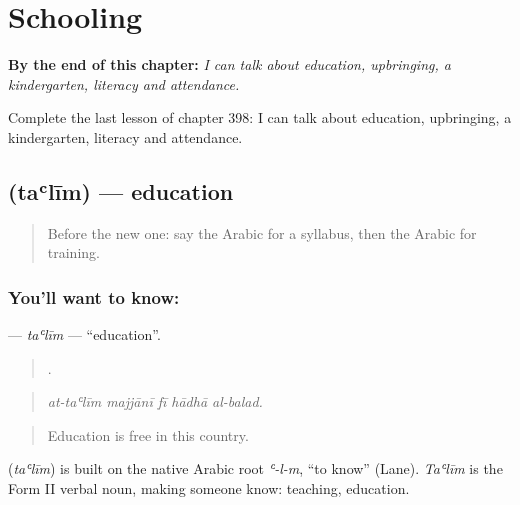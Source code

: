 
\chapter{Schooling}
\label{ch:ar-schooling}

\begin{chapteropening}
\textbf{By the end of this chapter:} \emph{I can talk about education, upbringing, a kindergarten, literacy and attendance.}

Complete the last lesson of chapter 398: I can talk about education, upbringing, a kindergarten, literacy and attendance.
\end{chapteropening}

\section[\texorpdfstring{\ar{تعليم} (taʿlīm)}{تعليم (taʿlīm)}]{ (taʿlīm) — education}

\label{lesson:AR-C398-talim}



\begin{quote}
Before the new one: say the Arabic for a syllabus, then the Arabic for training.
\end{quote}

\subsection*{You'll want to know: }
\textbf{} — \emph{taʿlīm} — \textquotedblleft{}education\textquotedblright{}.

\begin{quote}
    .
\end{quote}

\begin{quote}
\emph{at-taʿlīm majjānī fī hādhā al-balad.}
\end{quote}

\begin{quote}
Education is free in this country.
\end{quote}

\begin{cousinweb}
\textbf{} (\emph{taʿlīm}) is built on the native Arabic root \emph{ʿ-l-m}, \textquotedblleft{}to know\textquotedblright{} (Lane). \emph{Taʿlīm} is the Form II verbal noun, making someone know: teaching, education.
\end{cousinweb}

